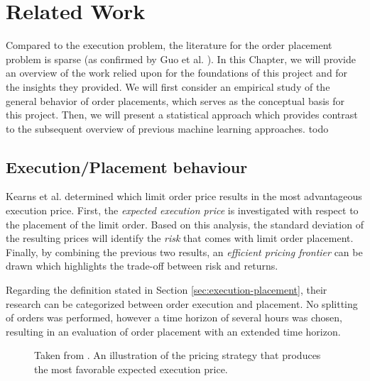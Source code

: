 \chapter{Related Work}
\label{chap:related-work}

Compared to the execution problem, the literature for the order placement problem is sparse (as confirmed by Guo et al. \cite{guo2013optimal}).
In this Chapter, we will provide an overview of the work relied upon for the foundations of this project and for the insights they provided.
We will first consider an empirical study of the general behavior of order placements, which serves as the conceptual basis for this project.
Then, we will present a statistical approach which provides contrast to the subsequent overview of previous machine learning approaches.
todo

\section{Execution/Placement behaviour}
\label{sec:related-execution-behaviour}

Kearns et al. \cite{nevmyvaka2005electronic} determined which limit order price results in the most advantageous execution price.
First, the \textit{expected execution price} is investigated with respect to the placement of the limit order. 
Based on this analysis, the standard deviation of the resulting prices will identify the \textit{risk} that comes with limit order placement. 
Finally, by combining the previous two results, an \textit{efficient pricing frontier} can be drawn which highlights the trade-off between risk and returns.

Regarding the definition stated in Section \ref{sec:execution-placement}, their research can be categorized between order execution and placement.
No splitting of orders was performed, however a time horizon of several hours was chosen, resulting in an evaluation of order placement with an extended time horizon.

\begin{figure}[H]
    \centering
    \caption{Taken from \cite{nevmyvaka2005electronic}. An illustration of the pricing strategy that produces the most favorable expected execution price.}
    \label{fig:kearns-return}
\end{figure}

